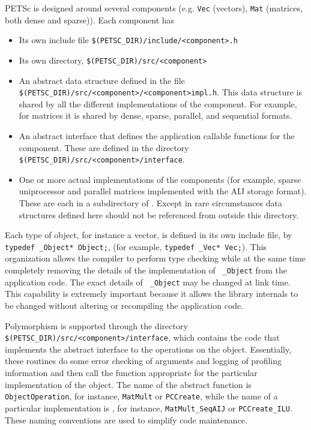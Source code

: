PETSc is designed around several components (e.g. {\tt Vec} (vectors),
{\tt Mat} (matrices, both dense and sparse)). Each component has
\begin{itemize}
\item Its own include file {\tt \$(PETSC\_DIR)/include/<component>.h} 
\item Its own directory, {\tt \$(PETSC\_DIR)/src/<component>}
\item An abstract data structure defined in  the file
      {\tt \$(PETSC\_DIR)/src/<component>/<component>impl.h}.
      This data structure is shared by all the different implementations of the 
      component. For example, for matrices it is shared by dense,
      sparse, parallel, and sequential formats.
\item An abstract interface that defines the application callable 
      functions for the component. These are defined in the directory
      {\tt \$(PETSC\_DIR)/src/<component>/interface}.
\item One or more actual implementations of the components (for example,
      sparse uniprocessor and parallel matrices implemented with the AIJ storage format).
      These are each in a subdirectory of 
      . Except in rare circumstances data 
      structures defined here should not be referenced from outside this 
      directory.
\end{itemize}

Each type of object, for instance a vector, is defined in its own
include file, by {\tt typedef \_Object* Object;}, (for example, 
{\tt typedef \_Vec* Vec;}).  This organization
allows the compiler to perform type checking while at the same time
completely removing the details of the implementation of {\tt
\_Object} from the application code. The exact details of {\tt
\_Object} may be changed at link time. This capability is extremely important
because it allows the library internals to be changed
without altering or recompiling the application code.

Polymorphism is supported through the directory {\tt \$(PETSC\_DIR)/src/<component>/interface},
which contains the code that implements the abstract interface to the
operations on the object.  Essentially, these routines do some error
checking of arguments and logging of profiling information 
and then call the function appropriate for the
particular implementation of the object. The name of the abstract
function is {\tt ObjectOperation}, for instance, {\tt MatMult} or {\tt PCCreate}, while
the name of a particular implementation is 
, for instance, 
{\tt MatMult\_SeqAIJ} or {\tt PCCreate\_ILU}. These naming
conventions are used to simplify code maintenance.

